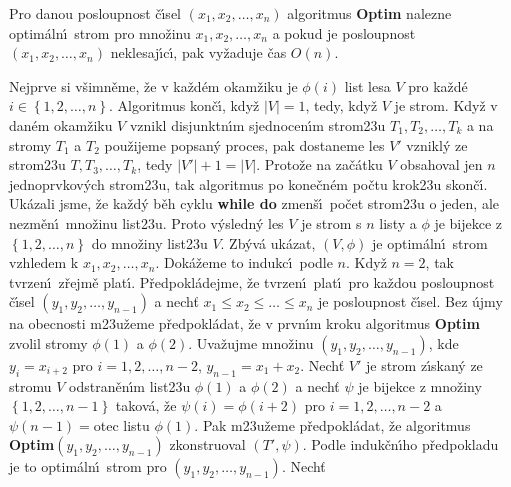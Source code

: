 Pro danou posloupnost \v c\'\i sel 
$\left(x_1,x_2,\dots,x_n\right)$ algoritmus {\bf Optim} nalezne optim\'aln\'\i\ strom 
pro mno\v zinu $x_1,x_2,\dots,x_n$ a pokud je posloupnost 
$\left(x_1,x_2,\dots,x_n\right)$ neklesaj\'\i c\'\i , pak vy\v zaduje \v cas 
$O\left(n\right)$.  
\endproclaim


Nejprve si v\v simn\v eme, \v ze v ka\v zd\'em 
okam\v ziku je $\phi \left(i\right)$ list lesa $V$ pro ka\v zd\'e $i\in \left\{1,
2,\dots,n\right\}$.  
Algoritmus kon\v c\'\i , kdy\v z $|V|=1$, tedy, kdy\v z $V$ je strom.  Kdy\v z v 
dan\'em okam\v ziku $V$ vznikl disjunktn\'\i m sjednocen\'\i m 
strom\accent23u $T_1,T_2,\dots,T_k$ a na stromy $T_1$ a $T_2$ pou\v zijeme 
popsan\'y proces, pak dostaneme les $V'$ vznikl\'y ze 
strom\accent23u $T,T_3,\dots,T_k$, tedy $|V'|+1=|V|$.  Proto\v ze na 
za\v c\'atku $V$ obsahoval jen $n$ jednoprvko\-v\'ych strom\accent23u, 
tak algoritmus po kone\v cn\'em po\v ctu krok\accent23u skon\v c\'\i .  Uk\'azali jsme, \v ze ka\v zd\'y b\v eh cyklu {\bf while 
do} zmen\v s\'\i\ po\v cet strom\accent23u o jeden, ale nezm\v en\'\i\ mno\v zinu 
list\accent23u.  Proto v\'ysledn\'y les $V$ je strom s $n$ listy a $
\phi$ je 
bijekce z $\left\{1,2,\dots,n\right\}$ do mno\v ziny list\accent23u $V$.  Zb\'yv\'a 
uk\'azat, $\left(V,\phi \right)$ je optim\'aln\'\i\ strom vzhledem k 
$x_1,x_2,\dots,x_n$. Dok\'a\v zeme to indukc\'\i\ podle $n$.  Kdy\v z 
$n=2$, tak tvrzen\'\i\ z\v rejm\v e plat\'\i .  P\v redpokl\'adejme, \v ze tvrzen\'\i\ 
plat\'\i\ pro ka\v zdou posloupnost \v c\'\i sel $\left(y_1,y_2,\dots,
y_{n-1}\right)$ a nech\v t 
$x_1\le x_2\le\dots\le x_n$ je posloupnost \v c\'\i sel.  Bez \'ujmy na obecnosti 
m\accent23u\v zeme p\v redpokl\'adat, \v ze v prvn\'\i m kroku algoritmus 
{\bf Optim} zvolil stro\-my $\phi \left(1\right)$ a $\phi \left(2\right)$.  Uva\v zujme mno\v zinu 
$\left(y_1,y_2,\dots,y_{n-1}\right)$, kde $y_i=x_{i+2}$ pro $i=1,2,\dots,n-2$, 
$y_{n-1}=x_1+x_2$. Nech\v t $V'$ je strom z\'\i skan\'y ze stromu $
V$  
odstran\v en\'\i m list\accent23u $\phi \left(1\right)$ a $\phi \left(2\right)$ a nech\v t $
\psi$ je bijekce z 
mno\v ziny $\left\{1,2,\dots,n-1\right\}$ takov\'a, \v ze $\psi \left(i\right)=\phi \left(i+
2\right)$ pro 
$i=1,2,\dots,n-2$ a $\psi \left(n-1\right)=$otec listu $\phi \left(1\right)$.  Pak 
m\accent23u\v zeme p\v redpokl\'adat, \v ze algoritmus 
{\bf Optim$\left(y_1,y_2,\dots,y_{n-1}\right)$} zkonstruoval $\left(T',\psi \right)$. Podle induk\v c\-n\'\i ho 
p\v redpokladu je to optim\'aln\'\i\ strom pro $\left(y_1,y_2,\dots,y_{
n-1}\right)$.  Nech\v t 
